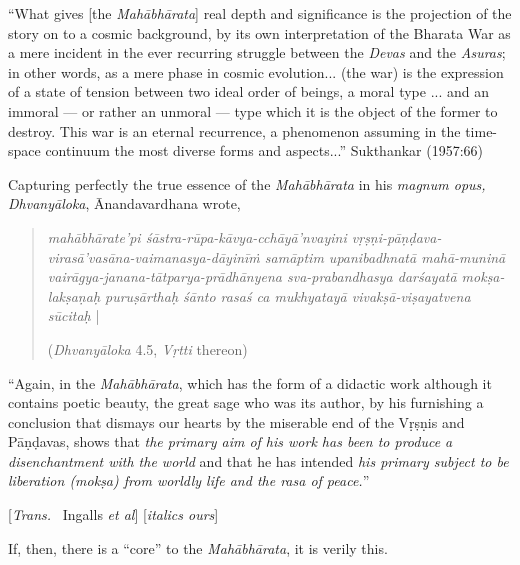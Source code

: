 \begin{myquote}
“What gives [the {\sl Mahābhārata}] real depth and significance is the projection of the story on to a cosmic background, by its own interpretation of the Bharata War as a mere incident in the ever recurring struggle between the {\sl Devas} and the {\sl Asuras}; in other words, as a mere phase in cosmic evolution... (the war) is the expression of a state of tension between two ideal order of beings, a moral type ...  and an immoral --- or rather an unmoral --- type which it is the object of the former to destroy. This war is an eternal recurrence, a phenomenon assuming in the time-space continuum the most diverse forms and aspects...” 
\hfill Sukthankar (1957:66)
\end{myquote}

Capturing perfectly the true essence of the {\sl Mahābhārata} in his {\sl magnum opus, Dhvanyāloka}, Ānandavardhana wrote, 

\begin{quote}
{{\sl mahābhārate'pi śāstra-rūpa-kāvya-cchāyā’nvayini vṛṣṇi-pāṇḍava-virasā’vasāna-vaimanasya-dāyinīṁ samāptim upanibadhnatā mahā-muninā vairāgya-janana-tātparya-prādhānyena sva-\break prabandhasya darśayatā mokṣa-lakṣaṇaḥ puruṣārthaḥ
 śānto rasaś ca mukhyatayā vivakṣā-viṣayatvena sūcitaḥ}} |\relax

\hfill ({\sl Dhvanyāloka} 4.5, {\sl Vṛtti} thereon)
\end{quote}

\begin{myquote}
“Again, in the {\sl Mahābhārata}, which has the form of a didactic work although it contains poetic beauty, the great sage who was its author, by his furnishing a conclusion that dismays our hearts by the miserable end of the Vṛṣṇis and Pāṇḍavas, shows that {\sl the primary aim of his work has been to produce a disenchantment with the world} and that he has intended {\sl his primary subject to be liberation (mokṣa) from worldly life and the rasa of peace.}”

\hfill [{\sl Trans.}~ Ingalls {\sl et al}] [{\sl italics ours}]
\end{myquote}

If, then, there is a “core” to the {\sl Mahābhārata}, it is verily this.  

